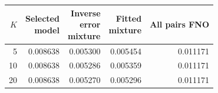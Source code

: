 \begin{tabular}{rrrrr}
\toprule
$K$ & \shortstack[r]{Selected\\model} & \shortstack[r]{Inverse\\error\\mixture} & \shortstack[r]{Fitted\\mixture} & All pairs FNO \\
\midrule
5 & 0.008638 & 0.005300 & 0.005454 & 0.011171 \\
10 & 0.008638 & 0.005286 & 0.005359 & 0.011171 \\
20 & 0.008638 & 0.005270 & 0.005296 & 0.011171 \\
\bottomrule
\end{tabular}
